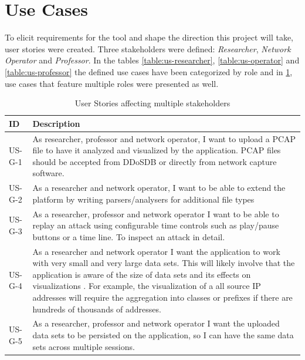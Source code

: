 \section{Use Cases}
\label{sec:usecases}
To elicit requirements for the tool and shape the direction this project will take, user stories were created. Three stakeholders were defined: \emph{Researcher}, \emph{Network Operator} and \emph{Professor}. In the tables \ref{table:us-researcher}, \ref{table:us-operator} and \ref{table:us-professor} the defined use cases have been categorized by role and in \ref{table:us-general}, use cases that feature multiple roles were presented as well.



\begin{table}[]
\centering
\begin{tabular}{|p{1.6cm}|p{12cm}|}
\hline
\textbf{ID} & \textbf{Description} \\ \hline

US-G-1         & As researcher, professor and network operator, I want to upload a PCAP file to have it analyzed and  visualized by the application. PCAP files should be accepted from DDoSDB or directly from network capture software.\\ \hline

US-G-2         & As a researcher and network operator, I want to be able to extend the platform by writing parsers/analysers for additional file types\\ \hline

US-G-3         & As a researcher, professor and network operator I want to be able to replay an attack using configurable time controls such as play/pause buttons or a time line. To inspect an attack in detail.\\ \hline
US-G-4       & As a researcher and network operator I want the application to work with very small and very large data sets. This will likely involve that the application is aware of the size of data sets and its effects on visualizations \cite{appliedsecurityvisualization}. For example, the visualization of a all source IP addresses will require the aggregation into classes or prefixes if there are hundreds of thousands of addresses.\\ \hline
US-G-5         & As a researcher, professor and network operator I want the uploaded data sets to be persisted on the application, so I can have the same data sets across multiple sessions.\\ \hline
\end{tabular}
\caption{User Stories affecting multiple stakeholders}
\label{table:us-general}
\end{table} 





